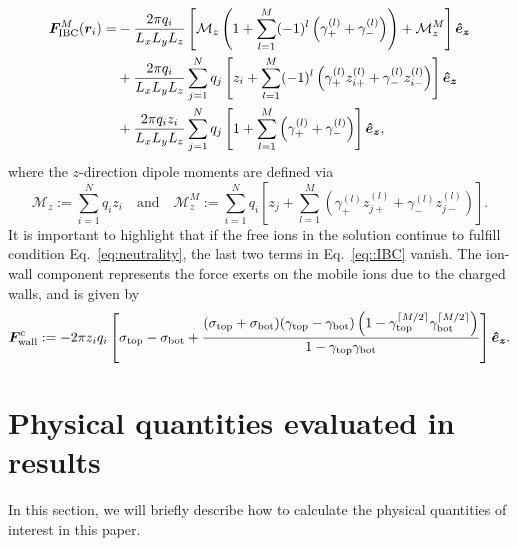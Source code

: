 \begin{equation}\label{eq::IBC}
\begin{split}
\bm{F}_{\text{IBC}}^{M}(\bm{r}_i)=&-\frac{2\pi q_{i}}{L_xL_yL_z}\left[\mathcal{M}_{z}\left(1+\sum_{l=1}^{M}(-1)^{l}\left(\gamma_{+}^{(l)}+\gamma_{-}^{(l)}\right)\right)+\mathcal{M}_{z}^{M}\right]\boldsymbol{\hat e_z}\\
&+\frac{2\pi q_i}{L_xL_yL_z}\sum_{j=1}^{N}q_j\left[z_i+\sum_{l=1}^{M}(-1)^{l}\left(\gamma_{+}^{(l)}z_{i+}^{(l)}+\gamma_{-}^{(l)}z_{i-}^{(l)}\right)\right]\boldsymbol{\hat e_z}\\
&+\frac{2\pi q_iz_i}{L_xL_yL_z}\sum_{j=1}^{N}q_j\left[1+\sum_{l=1}^{M}\left(\gamma_{+}^{(l)}+\gamma_{-}^{(l)}\right)\right]\boldsymbol{\hat e_z},
\end{split}
\end{equation}
where the $z$-direction dipole moments are defined via
\begin{equation}
\mathcal{M}_{z}:=\sum_{i=1}^{N}q_iz_i\quad\text{and}\quad \mathcal{M}_{z}^{M}:=\sum_{i=1}^{N}q_i\left[z_{j}+\sum_{l=1}^{M}\left(\gamma_{+}^{(l)}z_{j+}^{(l)}+\gamma_{-}^{(l)}z_{j-}^{(l)}\right)\right].
\end{equation}
It is important to highlight that if the free ions in the solution continue to fulfill condition Eq.~\eqref{eq:neutrality}, the last two terms in Eq.~\eqref{eq::IBC} vanish. 
The ion-wall component represents the force exerts on the mobile ions due to the charged walls, and is given by
\begin{equation}
\bm{F}_{\text{wall}}^{\text{c}}:=-2\pi z_{i}q_{i}\left[\sigma_{\text{top}}-\sigma_{\text{bot}}+\frac{(\sigma_{\text{top}}+\sigma_{\text{bot}})(\gamma_{\text{top}}-\gamma_{\text{bot}})\left(1-\gamma_{\text{top}}^{\lceil M/2 \rceil}\gamma_{\text{bot}}^{\lceil M/2 \rceil}\right)}{1-\gamma_{\text{top}}\gamma_{\text{bot}}}\right]\boldsymbol{\hat e_z}.
\end{equation}

\section{Physical quantities evaluated in results}\label{Sec::phyquan}

In this section, we will briefly describe how to calculate the physical quantities of interest in this paper.

